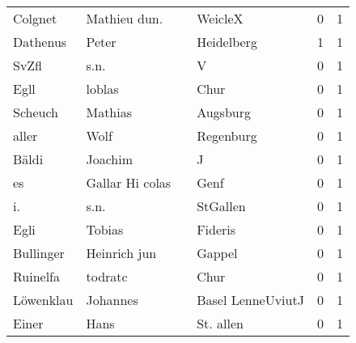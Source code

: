 \begin{center}
\begin{tiny}
\begin{longtabu}{llllrr}
                  Colgnet &                       Mathieu dun. &             &                                     WeicleX &          0 &         1 \\
                 Dathenus &                              Peter &             &                                  Heidelberg &          1 &         1 \\
                    SvZfl &                               s.n. &             &                                           V &          0 &         1 \\
                     Egll &                             loblas &             &                                        Chur &          0 &         1 \\
                  Scheuch &                            Mathias &             &                                    Augsburg &          0 &         1 \\
                    aller &                               Wolf &             &                                   Regenburg &          0 &         1 \\
                    Bäldi &                            Joachim &             &                                           J &          0 &         1 \\
                       es &                    Gallar Hi colas &             &                                        Genf &          0 &         1 \\
                       i. &                               s.n. &             &                                    StGallen &          0 &         1 \\
                     Egli &                             Tobias &             &                                     Fideris &          0 &         1 \\
                Bullinger &                       Heinrich jun &             &                                      Gappel &          0 &         1 \\
                 Ruinelfa &                            todratc &             &                                        Chur &          0 &         1 \\
                Löwenklau &                           Johannes &             &                           Basel LenneUviutJ &          0 &         1 \\
                    Einer &                               Hans &             &                                   St. allen &          0 &         1 \\

\end{longtabu}
\end{tiny}
\end{center}
